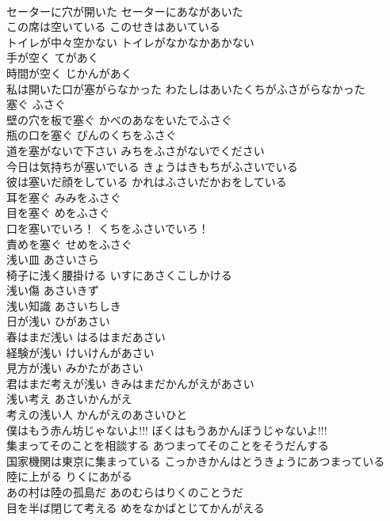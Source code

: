 \documentclass[8pt]{extreport}
\begin{document}
\begin{CJK}{UTF8}{min}
\\	セーターに穴が開いた	セーターにあながあいた	
\\	この席は空いている	このせきはあいている	
\\	トイレが中々空かない	トイレがなかなかあかない	
\\	手が空く	てがあく	
\\	時間が空く	じかんがあく	
\\	私は開いた口が塞がらなかった	わたしはあいたくちがふさがらなかった	
\\	塞ぐ	ふさぐ	
\\	壁の穴を板で塞ぐ	かべのあなをいたでふさぐ	
\\	瓶の口を塞ぐ	びんのくちをふさぐ	
\\	道を塞がないで下さい	みちをふさがないでください	
\\	今日は気持ちが塞いでいる	きょうはきもちがふさいでいる	
\\	彼は塞いだ顔をしている	かれはふさいだかおをしている	
\\	耳を塞ぐ	みみをふさぐ	
\\	目を塞ぐ	めをふさぐ	
\\	口を塞いでいろ！	くちをふさいでいろ！	
\\	責めを塞ぐ	せめをふさぐ	
\\	浅い皿	あさいさら	
\\	椅子に浅く腰掛ける	いすにあさくこしかける	
\\	浅い傷	あさいきず	
\\	浅い知識	あさいちしき	
\\	日が浅い	ひがあさい	
\\	春はまだ浅い	はるはまだあさい	
\\	経験が浅い	けいけんがあさい	
\\	見方が浅い	みかたがあさい	
\\	君はまだ考えが浅い	きみはまだかんがえがあさい	
\\	浅い考え	あさいかんがえ	
\\	考えの浅い人	かんがえのあさいひと	
\\	僕はもう赤ん坊じゃないよ!!!	ぼくはもうあかんぼうじゃないよ!!!	
\\	集まってそのことを相談する	あつまってそのことをそうだんする	
\\	国家機関は東京に集まっている	こっかきかんはとうきょうにあつまっている	
\\	陸に上がる	りくにあがる	
\\	あの村は陸の孤島だ	あのむらはりくのことうだ	
\\	目を半ば閉じて考える	めをなかばとじてかんがえる	

\end{CJK}
\end{document}
